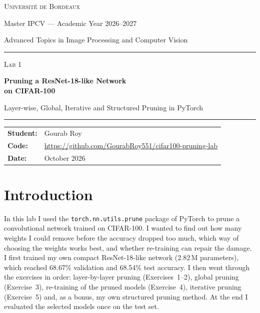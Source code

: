 \documentclass[11pt,a4paper]{article}
\newcommand{\code}[1]{\texttt{#1}}
\newcommand{\studentname}{Gourab Roy}
\newcommand{\githublink}{https://github.com/GourabRoy551/cifar100-pruning-lab}
\begin{document}
\begin{titlepage}
\centering
\vspace*{1.5cm}
{\Large\scshape Universit\'e de Bordeaux\par}
\vspace{0.4cm}
{\large Master IPCV --- Academic Year 2026--2027\par}
\vspace{0.2cm}
{\large Advanced Topics in Image Processing and Computer Vision\par}

\vspace{2cm}
\rule{\linewidth}{0.8pt}\par
\vspace{0.5cm}
{\large\scshape Lab 1\par}
\vspace{0.4cm}
{\huge\bfseries Pruning a ResNet-18-like Network\\[0.2cm] on CIFAR-100\par}
\vspace{0.5cm}
{\Large Layer-wise, Global, Iterative and Structured Pruning in PyTorch\par}
\vspace{0.5cm}
\rule{\linewidth}{0.8pt}\par

\vfill
\begin{tabular}{@{}ll@{}}
\textbf{Student:} & \studentname \\[0.3em]
\textbf{Code:}    & \expandafter\url\expandafter{\githublink} \\[0.3em]
\textbf{Date:}    & October 2026 \\
\end{tabular}
\vspace{2.5cm}
\end{titlepage}

\tableofcontents
\newpage

\section{Introduction}

In this lab I used the \code{torch.nn.utils.prune} package of PyTorch to prune a convolutional network trained on CIFAR-100. I wanted to find out how many weights I could remove before the accuracy dropped too much, which way of choosing the weights works best, and whether re-training can repair the damage. I first trained my own compact ResNet-18-like network (2.82\,M parameters), which reached 68.67\% validation and 68.54\% test accuracy. I then went through the exercises in order: layer-by-layer pruning (Exercises~1--2), global pruning (Exercise~3), re-training of the pruned models (Exercise~4), iterative pruning (Exercise~5) and, as a bonus, my own structured pruning method. At the end I evaluated the selected models once on the test set.
\end{document}

